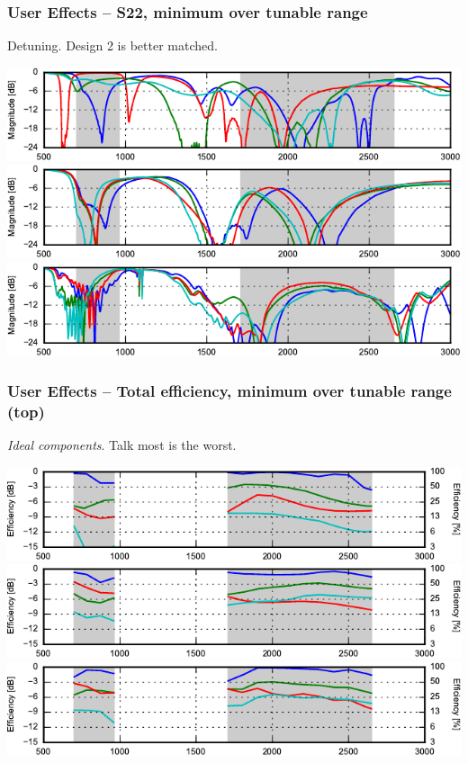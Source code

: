 \begin{frame}
    \frametitle{User Effects -- S22, minimum over tunable range}
    Detuning. Design 2 is better matched.
    \begin{center}
        \includegraphics{img/soren/ue/design1lt/s22side.pdf}\\
        \includegraphics{img/soren/ue/design2sn/s22side.pdf}\\
        \includegraphics{img/soren/ue/design3hv/s22side.pdf}
    \end{center}
    \legendfooter
\end{frame}

\begin{frame}
    \frametitle{User Effects -- Total efficiency, minimum over tunable range (top)}
    \textit{Ideal components}. Talk most is the worst.
    \begin{center}
        \includegraphics{img/soren/ue/design1lt/efftop.pdf}\\
        \includegraphics{img/soren/ue/design2sn/efftop.pdf}\\
        \includegraphics{img/soren/ue/design3hv/efftop.pdf}
    \end{center}
    \legendfooter
\end{frame}

